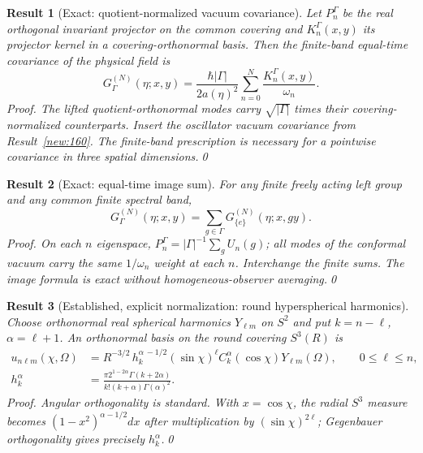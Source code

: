 \documentclass[aps,prd,onecolumn,notitlepage,groupedaddress,11pt]{revtex4-2}
\newtheorem{result}{Result}
\begin{document}
\begin{result}[\textsf{Exact}: quotient-normalized vacuum covariance]\label{new:161}
Let $P_n^\Gamma$ be the real orthogonal invariant projector on the common covering and $K_n^\Gamma(x,y)$ its projector kernel in a covering-orthonormal basis. Then the finite-band equal-time covariance of the \emph{physical} field is
\begin{equation}\label{new:eq161}
 G^{(N)}_\Gamma(\eta;x,y)=\frac{\hbar|\Gamma|}{2a(\eta)^2}\sum_{n=0}^N\frac{K_n^\Gamma(x,y)}{\omega_n}.
\end{equation}
\textit{Proof.} The lifted quotient-orthonormal modes carry $\sqrt{|\Gamma|}$ times their covering-normalized counterparts. Insert the oscillator vacuum covariance from Result~\ref{new:160}. The finite-band prescription is necessary for a pointwise covariance in three spatial dimensions.\qed
\end{result}

\begin{result}[\textsf{Exact}: equal-time image sum]\label{new:162}
For any finite freely acting left group and any common finite spectral band,
\begin{equation}\label{new:eq162}
 G^{(N)}_\Gamma(\eta;x,y)=\sum_{g\in\Gamma}G^{(N)}_{\{e\}}(\eta;x,gy).
\end{equation}
\textit{Proof.} On each $n$ eigenspace, $P_n^\Gamma=|\Gamma|^{-1}\sum_gU_n(g)$; all modes of the conformal vacuum carry the same $1/\omega_n$ weight at each $n$. Interchange the finite sums. The image formula is exact without homogeneous-observer averaging.\qed
\end{result}

\begin{result}[\textsf{Established, explicit normalization}: round hyperspherical harmonics]\label{new:163}
Choose orthonormal real spherical harmonics $Y_{\ell m}$ on $S^2$ and put $k=n-\ell$, $\alpha=\ell+1$. An orthonormal basis on the round covering $S^3(R)$ is
\begin{align}\label{new:eq163}
 u_{n\ell m}(\chi,\Omega)&=R^{-3/2}\,h_k^{\alpha\,-1/2}(\sin\chi)^\ell C_k^\alpha(\cos\chi)Y_{\ell m}(\Omega),\qquad 0\le\ell\le n,\\
 h_k^\alpha&=\frac{\pi 2^{1-2\alpha}\Gamma(k+2\alpha)}{k!(k+\alpha)\Gamma(\alpha)^2}.
\end{align}
\textit{Proof.} Angular orthogonality is standard. With $x=\cos\chi$, the radial $S^3$ measure becomes $(1-x^2)^{\alpha-1/2}dx$ after multiplication by $(\sin\chi)^{2\ell}$; Gegenbauer orthogonality gives precisely $h_k^\alpha$.\qed
\end{result}
\end{document}
